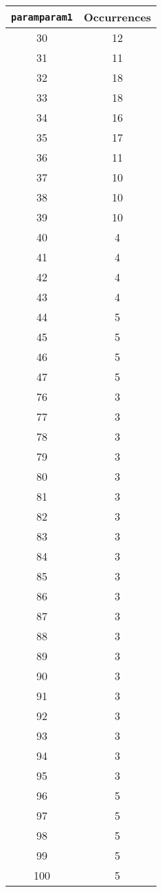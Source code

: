 \documentclass[letterpaper, 12pt]{article}
\begin{document}
\begin{longtable}{|c|c|}
\hline
\textbf{\texttt{paramparam1}} & \textbf{Occurrences} \\
\hline
30 & 12 \\
\hline
31 & 11 \\
\hline
32 & 18 \\
\hline
33 & 18 \\
\hline
34 & 16 \\
\hline
35 & 17 \\
\hline
36 & 11 \\
\hline
37 & 10 \\
\hline
38 & 10 \\
\hline
39 & 10 \\
\hline
40 & 4 \\
\hline
41 & 4 \\
\hline
42 & 4 \\
\hline
43 & 4 \\
\hline
44 & 5 \\
\hline
45 & 5 \\
\hline
46 & 5 \\
\hline
47 & 5 \\
\hline
76 & 3 \\
\hline
77 & 3 \\
\hline
78 & 3 \\
\hline
79 & 3 \\
\hline
80 & 3 \\
\hline
81 & 3 \\
\hline
82 & 3 \\
\hline
83 & 3 \\
\hline
84 & 3 \\
\hline
85 & 3 \\
\hline
86 & 3 \\
\hline
87 & 3 \\
\hline
88 & 3 \\
\hline
89 & 3 \\
\hline
90 & 3 \\
\hline
91 & 3 \\
\hline
92 & 3 \\
\hline
93 & 3 \\
\hline
94 & 3 \\
\hline
95 & 3 \\
\hline
96 & 5 \\
\hline
97 & 5 \\
\hline
98 & 5 \\
\hline
99 & 5 \\
\hline
100 & 5 \\

\end{longtable}
\end{document}
